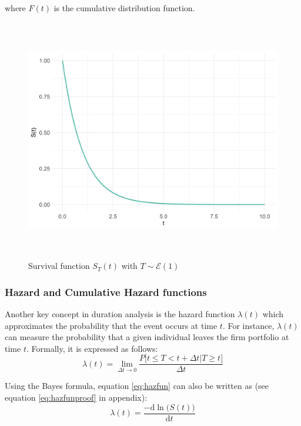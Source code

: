 \documentclass[
]{book}
\begin{document}
where \(F(t)\) is the cumulative distribution function.

\begin{figure}

{\centering \includegraphics[width=400pt,height=300pt]{./imgs/surv_fun_plot} 

}

\caption{Survival function $S_T(t)$ with $T \sim \mathcal{E} (1)$}\label{fig:survfunplot}
\end{figure}

\hypertarget{hazard-and-cumulative-hazard-functions}{%
\subsubsection*{Hazard and Cumulative Hazard functions}\label{hazard-and-cumulative-hazard-functions}}

Another key concept in duration analysis is the hazard function \(\lambda(t)\) which approximates the probability that the event occurs at time \(t\). For instance, \(\lambda(t)\) can measure the probability that a given individual leaves the firm portfolio at time \(t\). Formally, it is expressed as follows:
\begin{equation}
  \lambda(t) = \lim_{\Delta t \to 0} \frac{P\big[t \leq T < t + \Delta t | T \geq t \big]}{\Delta t}
  \label{eq:hazfun}
\end{equation}

Using the Bayes formula, equation \eqref{eq:hazfun} can also be written as (see equation \eqref{eq:hazfunproof} in appendix):
\begin{equation}
  \lambda(t) = \frac{-\text{d} \ln \big(S(t)\big)}{\text{d} t}
  \label{eq:hazfunbis}
\end{equation}
\end{document}
